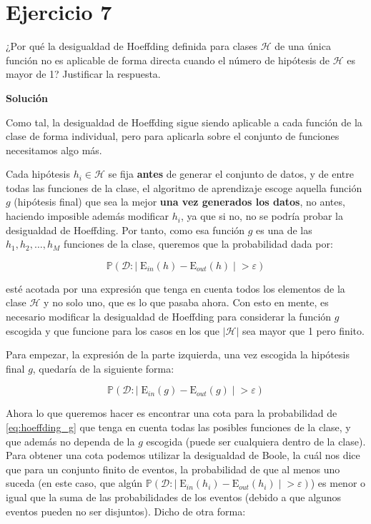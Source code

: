 \documentclass[11pt,a4paper]{article}
\newcommand{\answer}{\noindent\textbf{Solución}}
\newcommand{\addtoc}[1]{\addcontentsline{toc}{section}{#1}}
\begin{document}
\section*{Ejercicio 7}
\addtoc{Ejercicio 7}

\noindent ¿Por qué la desigualdad de Hoeffding definida para clases $\mathcal{H}$ de una única función no es aplicable de
forma directa cuando el número de hipótesis de $\mathcal{H}$ es mayor de 1? Justificar la respuesta.

\answer

Como tal, la desigualdad de Hoeffding sigue siendo aplicable a cada función de la clase de forma individual, pero para 
aplicarla sobre el conjunto de funciones necesitamos algo más. 

Cada hipótesis $h_i \in \mathcal{H}$ se fija \textbf{antes} de generar el conjunto de datos,
y de entre todas las funciones de la clase, el algoritmo de aprendizaje escoge aquella función $g$ (hipótesis final)
que sea la mejor \textbf{una vez generados los datos}, no antes, haciendo imposible además modificar $h_i$, ya que si no, 
no se podría probar la desigualdad de Hoeffding.
Por tanto, como esa función $g$ es una de las $h_1, h_2, \dots, h_M$ funciones de la clase, queremos que la probabilidad
dada por:

\[ \mathbb{P}(\mathcal{D}: | \; \text{E}_{in}(h) - \text{E}_{out}(h) \; | \; > \varepsilon)\]

\noindent esté acotada por una expresión que tenga en cuenta todos los elementos de la clase $\mathcal{H}$
y no solo uno, que es lo que pasaba ahora. Con esto en mente, es necesario modificar la desigualdad de Hoeffding para
considerar la función $g$ escogida y que funcione para los casos en los que $|\mathcal{H}|$ sea mayor que 1 pero finito.

Para empezar, la expresión de la parte izquierda, una vez escogida la hipótesis final $g$, quedaría de la siguiente forma:

\begin{equation}
\label{eq:hoeffding_g}
	\mathbb{P}(\mathcal{D}: | \; \text{E}_{in}(g) - \text{E}_{out}(g) \; | \; > \varepsilon)
\end{equation}

Ahora lo que queremos hacer es encontrar una cota para la probabilidad de \eqref{eq:hoeffding_g} que tenga en cuenta todas
las posibles funciones de la clase, y que además no dependa de la $g$ escogida (puede ser cualquiera dentro de la clase).
Para obtener una cota podemos utilizar la desigualdad de Boole, la cuál nos dice que para un conjunto finito de eventos, la
probabilidad de que al menos uno suceda (en este caso, que algún
$\mathbb{P}(\mathcal{D}: | \; \text{E}_{in}(h_i) - \text{E}_{out}(h_i) \; | \; > \varepsilon)$) es menor o igual que la suma
de las probabilidades de los eventos (debido a que algunos eventos pueden no ser disjuntos). Dicho de otra forma:
\end{document}

